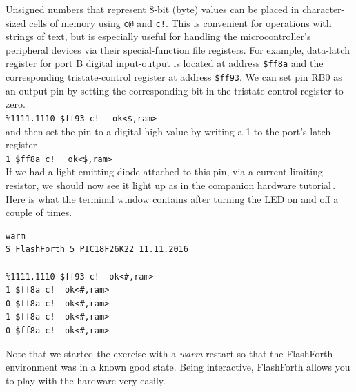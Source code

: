 \documentclass[12pt,a4paper]{article}
\begin{document}
\medskip
Unsigned numbers that represent 8-bit (byte) values can be placed in character-sized cells
of memory using \verb?c@? and \verb?c!?.
This is convenient for operations with strings of text, but is especially useful
for handling the microcontroller's peripheral devices via their special-function
file registers.
For example, data-latch register for port B digital input-output 
is located at address \verb!$ff8a! 
and the corresponding tristate-control register at address \verb!$ff93!.
We can set pin RB0 as an output pin by setting the corresponding bit in the 
tristate control register to zero. \vspace{7pt} \\
\verb?%1111.1110 $ff93 c!? \fbox{$\hookleftarrow$} \verb!  ok<$,ram>! \vspace{7pt} \\
and then set the pin to a digital-high value by writing a 1 to the port's latch register \vspace{7pt} \\
\verb?1 $ff8a c!? \fbox{$\hookleftarrow$} \verb!  ok<$,ram>! \vspace{7pt} \\
If we had a light-emitting diode attached to this pin, via a current-limiting resistor,
we should now see it light up as in the companion hardware tutorial\,\cite{jacobs_2016a}.
Here is what the terminal window contains after turning the LED on and off a couple of times.
\begin{verbatim}
warm 
S FlashForth 5 PIC18F26K22 11.11.2016

%1111.1110 $ff93 c!  ok<#,ram>
1 $ff8a c!  ok<#,ram>
0 $ff8a c!  ok<#,ram>
1 $ff8a c!  ok<#,ram>
0 $ff8a c!  ok<#,ram>
\end{verbatim}
Note that we started the exercise with a \textit{warm} restart so that the FlashForth
environment was in a known good state.
Being interactive, FlashForth allows you to play with the hardware very easily.


\medskip
\end{document}
